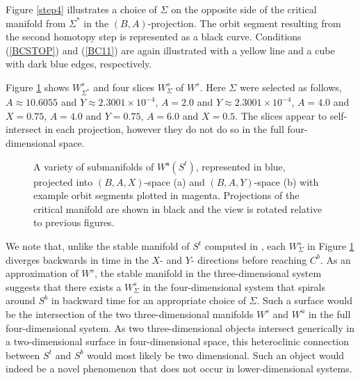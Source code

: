 \documentclass{ws-ijbc}
\begin{document}
Figure \ref{step4} illustrates a choice of $\Sigma$ on the opposite side of the critical manifold from $\Sigma^*$ in the $(B,A)$-projection.  The orbit segment resulting from the second homotopy step is represented as a black curve.  Conditions (\ref{BCSTOP}) and (\ref{BC11}) are again illustrated with a yellow line and a cube with dark blue edges, respectively.
    
Figure \ref{pieces} shows $W^s_{\Sigma^*}$ and four slices $W^{s}_{\Sigma}$ of $W^{s}$.  Here $\Sigma$ were selected as follows, $A\approx10.6055$ and $Y\approx2.3001 \times 10^{-4}$, $A=2.0$ and $Y\approx2.3001 \times 10^{-4}$, $A=4.0$ and $X=0.75$, $A=4.0$ and $Y=0.75$, $A=6.0$ and $X=0.5$.  The slices appear to self-intersect in each projection, however they do not do so in the full four-dimensional space.  

\begin{figure}[h]
\centering
{}
\caption{A variety of submanifolds of $W^{\mathbf{s}}(S^t)$, represented in blue, projected into $(B,A,X)$-space (a) and $(B,A,Y)$-space (b) with example orbit segments plotted in magenta.  Projections of the critical manifold are shown in black and the view is rotated relative to previous figures.}
\label{pieces}
\end{figure}
    
We note that, unlike the stable manifold of $S^t$ computed in \cite{QSSA}, each $W^{s}_{\Sigma}$ in Figure \ref{pieces} diverges backwards in time in the $X$- and $Y$- directions before reaching $C^b$.  As an approximation of $W^s$, the stable manifold in the three-dimensional system suggests that there exists a $W^{s}_{\Sigma}$ in the four-dimensional system that spirals around $S^b$ in backward time for an appropriate choice of $\Sigma$.  Such a surface would be the intersection of the two three-dimensional manifolds $W^s$ and $W^u$ in the full four-dimensional system.  As two three-dimensional objects intersect generically in a two-dimensional surface in four-dimensional space, this heteroclinic connection between $S^t$ and $S^b$ would most likely be two dimensional.  Such an object would indeed be a novel phenomenon that does not occur in lower-dimensional systems.
\end{document}
